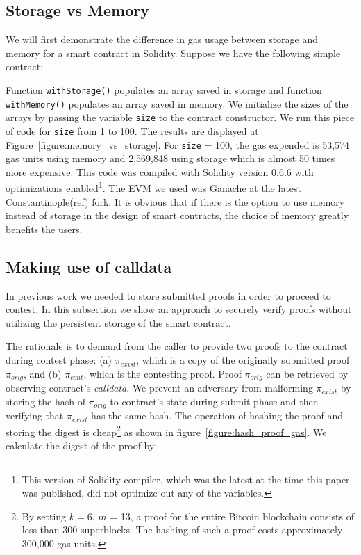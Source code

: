 \subsection{Storage vs Memory}

We will first demonstrate the difference in gas usage between storage and
memory for a smart contract in Solidity. Suppose we have the following simple
contract:



Function \texttt{withStorage()} populates an array saved in storage and
function \texttt{withMemory()} populates an array saved in memory. We
initialize the sizes of the arrays by passing the variable \texttt{size} to the
contract constructor. We run this piece of code for \texttt{size} from 1 to
100. The results are displayed at Figure~\ref{figure:memory_vs_storage}. For
\texttt{size} = 100, the gas expended is 53,574 gas units using memory and
2,569,848 using storage which is almost 50 times more expensive. This code was
compiled with Solidity version 0.6.6 with optimizations enabled\footnote{This
version of Solidity compiler, which was the latest at the time this paper was
published, did not optimize-out any of the variables.}. The EVM we used  was
Ganache at the latest Constantinople(ref) fork. It is obvious that if there is
the option to use memory instead of storage in the design of smart contracts,
the choice of memory greatly benefits the users.



\subsection{Making use of calldata}

In previous work we needed to store submitted proofs in order to proceed to
contest. In this subsection we show an approach to securely verify proofs
without utilizing the persistent storage of the smart contract.

The rationale is to demand from the caller to provide two proofs to the
contract during contest phase: (a) $\pi_{exist}$, which is a copy of the
originally submitted proof $\pi_{orig}$, and (b) $\pi_{cont}$, which is the
contesting proof. Proof $\pi_{orig}$ can be retrieved by observing contract's
\textit{calldata}. We prevent an adversary from malforming $\pi_{exist}$ by
storing the hash of $\pi_{orig}$ to contract's state during submit phase and
then verifying that $\pi_{exist}$ has the same hash. The operation of hashing
the proof and storing the digest is cheap\footnote{By setting $k=6$, $m$ = 13,
a proof for the entire Bitcoin blockchain consists of less than 300
superblocks. The hashing of such a proof costs approximately 300,000 gas
units.} as shown in figure~\ref{figure:hash_proof_gas}. We calculate the digest
of the proof by:

